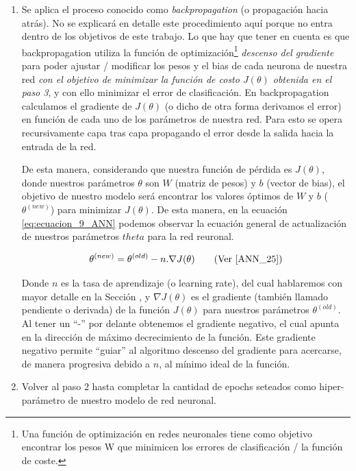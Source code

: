 \documentclass[12pt,a4paper]{article}
\begin{document}
\begin{sloppypar}
\begin{enumerate}
\item Se aplica el proceso conocido como \textit{backpropagation} (o propagación hacia atrás). No se explicará en detalle este procedimiento aquí porque no entra dentro de los objetivos de este trabajo. Lo que hay que tener en cuenta es que backpropagation utiliza la función de optimización\footnote{Una función de optimización en redes neuronales tiene como objetivo encontrar los pesos W que minimicen los errores de clasificación / la función de coste.} \textit{descenso del gradiente} para poder ajustar / modificar los pesos y el bias de cada neurona de nuestra red \textit{con el objetivo de minimizar la función de costo $J(\theta)$ obtenida en el paso 3}, y con ello minimizar el error de clasificación. En backpropagation calculamos el gradiente de $J(\theta)$ (o dicho de otra forma derivamos el error) en función de cada uno de los parámetros de nuestra red. Para esto se opera recursivamente capa tras capa propagando el error desde la salida hacia la entrada de la red.

De esta manera, considerando que nuestra función de pérdida es $J(\theta)$, donde nuestros parámetros $\theta$ son $W$ (matriz de pesos) y $b$ (vector de bias), el objetivo de nuestro modelo será encontrar los valores óptimos de $W$ y $b$ ($\theta^{(new)}$) para minimizar $J(\theta)$. De esta manera, en la ecuación \ref{eq:ecuacion_9_ANN} podemos observar la ecuación general de actualización de nuestros parámetros $theta$ para la red reuronal.
 
\begin{equation}\label{eq:ecuacion_9_ANN}
\theta^{(new)} = \theta^{(old)} - n . \nabla J(\theta)   \qquad \text{(Ver \cite{ANN_25})}
\end{equation}

Donde $n$ es la tasa de aprendizaje (o learning rate), del cual hablaremos con mayor detalle en la Sección \textit{}, y $\nabla J(\theta)$ es el gradiente (también llamado pendiente o derivada) de la función $J(\theta)$ para nuestros parámetros $\theta^{(old)}$. Al tener un “-” por delante obtenemos el gradiente negativo, el cual apunta en la dirección de máximo decrecimiento de la función. Este gradiente negativo permite “guiar” al algoritmo descenso del gradiente para acercarse, de manera progresiva debido a $n$, al mínimo ideal de la función.      

\item Volver al paso 2 hasta completar la cantidad de epochs seteados como hiper-parámetro de nuestro modelo de red neuronal. 


\end{enumerate}
\end{sloppypar}
\end{document}
